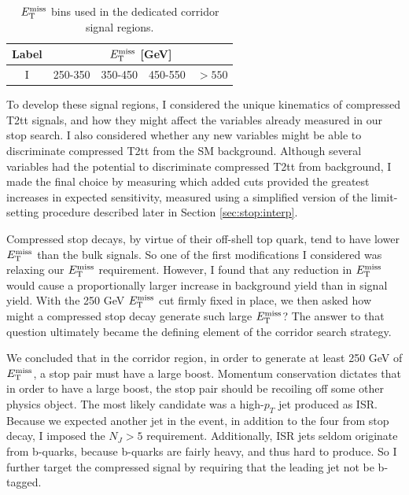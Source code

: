 \begin{table}[h]
\centering
\caption{$E_\text{T}^\text{miss}$ bins used in the dedicated corridor signal regions.}
\label{tab:stop:corridorsrs}
\begin{tabular}{|c|cccc|}
\hline
Label & \multicolumn{4}{c|}{$E_\text{T}^\text{miss}$ [GeV]} \\
\hline
I & 250-350 & 350-450 & 450-550 & $>550$ \\
\hline
\end{tabular}
\end{table}

To develop these signal regions, I considered the unique kinematics of
compressed T2tt signals, and how they might affect the variables
already measured in our stop search. I also considered whether any new
variables might be able to discriminate compressed T2tt from the SM
background. Although several variables had the potential to
discriminate compressed T2tt from background, I made the final choice
by measuring which added cuts provided the greatest increases in
expected sensitivity, measured using a simplified version of the
limit-setting procedure described later in Section
\ref{sec:stop:interp}.

Compressed stop decays, by virtue of their off-shell top quark, tend
to have lower $E_\text{T}^\text{miss}$ than the bulk signals. So one of the first
modifications I considered was relaxing our $E_\text{T}^\text{miss}$
requirement. However, I found that any reduction in $E_\text{T}^\text{miss}$ would cause a
proportionally larger increase in background yield than in signal
yield. With the 250 GeV $E_\text{T}^\text{miss}$ cut firmly fixed in place, we then
asked how might a compressed stop decay generate such large $E_\text{T}^\text{miss}$?
The answer to that question ultimately became the defining element of
the corridor search strategy.

We concluded that in the corridor region, in order to generate at least
250 GeV of $E_\text{T}^\text{miss}$, a stop pair must have a large boost. Momentum conservation
dictates that in order to have a large boost, the stop pair should be
recoiling off some other physics object. The most likely candidate was
a high-$p_T$ jet produced as ISR. Because we expected another jet in
the event, in addition to the four from stop decay, I imposed the
$N_J > 5$ requirement. Additionally, ISR jets seldom originate from
b-quarks, because b-quarks are fairly heavy, and thus hard to
produce. So I further target the compressed signal by requiring
that the leading jet not be b-tagged.

